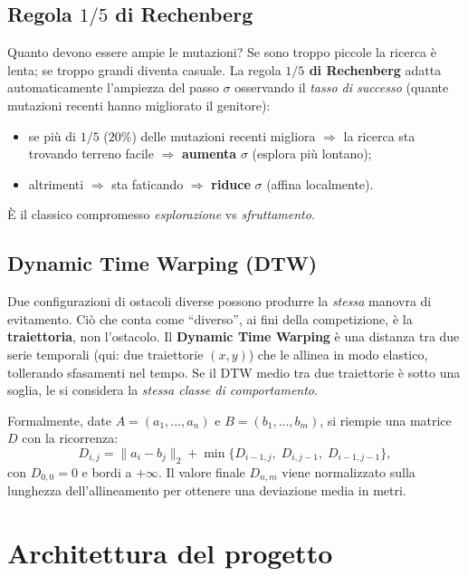 \documentclass[11pt,a4paper]{report}
\begin{document}
\section{Regola \texorpdfstring{$1/5$}{1/5} di Rechenberg}
Quanto devono essere ampie le mutazioni? Se sono troppo piccole la
ricerca è lenta; se troppo grandi diventa casuale. La regola
\textbf{$1/5$ di Rechenberg} adatta automaticamente l'ampiezza del passo
$\sigma$ osservando il \emph{tasso di successo} (quante mutazioni recenti
hanno migliorato il genitore):
\begin{itemize}
  \item se più di $1/5$ ($20\%$) delle mutazioni recenti migliora
        $\Rightarrow$ la ricerca sta trovando terreno facile
        $\Rightarrow$ \textbf{aumenta} $\sigma$ (esplora più lontano);
  \item altrimenti $\Rightarrow$ sta faticando $\Rightarrow$
        \textbf{riduce} $\sigma$ (affina localmente).
\end{itemize}
È il classico compromesso \emph{esplorazione} vs \emph{sfruttamento}.

\section{Dynamic Time Warping (DTW)}
Due configurazioni di ostacoli diverse possono produrre la
\emph{stessa} manovra di evitamento. Ciò che conta come ``diverso'', ai
fini della competizione, è la \textbf{traiettoria}, non l'ostacolo. Il
\textbf{Dynamic Time Warping} è una distanza tra due serie temporali
(qui: due traiettorie $(x,y)$) che le allinea in modo elastico,
tollerando sfasamenti nel tempo. Se il DTW medio tra due traiettorie è
sotto una soglia, le si considera la \emph{stessa classe di
comportamento}.

Formalmente, date $A=(a_1,\dots,a_n)$ e $B=(b_1,\dots,b_m)$, si riempie
una matrice $D$ con la ricorrenza:
\[
D_{i,j} = \lVert a_i - b_j\rVert_2 +
\min\{D_{i-1,j},\; D_{i,j-1},\; D_{i-1,j-1}\},
\]
con $D_{0,0}=0$ e bordi a $+\infty$. Il valore finale $D_{n,m}$ viene
normalizzato sulla lunghezza dell'allineamento per ottenere una
deviazione media in metri.

\chapter{Architettura del progetto}
\end{document}
